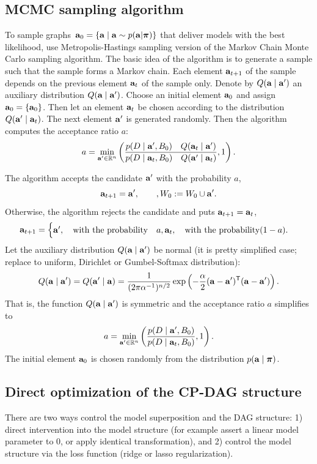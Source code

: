 \documentclass[12pt]{article}
\begin{document}
\subsection*{MCMC sampling algorithm}
To sample graphs~$\mathbf{a}_0 = \{\mathbf{a} \mid \mathbf{a} \sim p(\mathbf{a}|\boldsymbol{\pi})\}$ that deliver models with the best likelihood,
use Metropolis-Hastings sampling version of the Markov Chain Monte Carlo sampling algorithm.
The basic idea of the algorithm is to generate a sample such that the sample  forms a Markov chain.
Each element $\mathbf{a}_{t+1}$ of the sample depends on the previous element $\mathbf{a}_t$ of the sample  only.
Denote by $Q(\mathbf{a} \mid \mathbf{a}^\prime)$ an auxiliary distribution $Q(\mathbf{a}\mid \mathbf{a}^\prime)$.
Choose an initial element $\mathbf{a}_0$ and assign $\mathbf{a}_0 = \{\mathbf{a}_0\}$.
Then let an element $\mathbf{a}_t$ be chosen according  to the distribution $Q(\mathbf{a}^\prime\mid\mathbf{a}_t)$.
The next element $\mathbf{a}^\prime$ is generated randomly.
Then the algorithm computes the acceptance ratio $a$:
\[
    a = \min\limits_{\mathbf{a}^\prime\in\mathbb{R}^n}\left(
    \frac{p(D\mid\mathbf{a}^{\prime}, B_0)\quad Q(\mathbf{a}_t\mid\mathbf{a}^\prime)}
    {p(D\mid\mathbf{a}_t, B_0)\quad Q(\mathbf{a}^\prime\mid \mathbf{a}_t)}, 1\right).
\]

The algorithm accepts the candidate $\mathbf{a}^\prime$ with the probability $a$,
\[
    \mathbf{a}_{t+1} = \mathbf{a}^\prime, \qquad, W_0 := W_0 \cup \mathbf{a}^\prime.
\]
Otherwise, the algorithm rejects the candidate and puts $\mathbf{a}_{t+1} = \mathbf{a}_t$,
\[
\mathbf{a}_{t+1} =
\begin{cases}
\mathbf{a}^\prime, \quad\text{with the probability}\quad a,
\mathbf{a}_t, \quad\text{with the probability} (1-a).
\end{cases}
\]
Let the auxiliary distribution $Q(\mathbf{a} \mid \mathbf{a}^\prime)$ be normal (it is pretty simplified case; replace to uniform, Dirichlet or Gumbel-Softmax distribution):
\[
    Q(\mathbf{a} \mid \mathbf{a}^\prime) = Q(\mathbf{a}^\prime \mid \mathbf{a}) = \frac{1}{(2\pi\alpha^{-1})^{n/2}} \exp\left(-\frac{\alpha}{2}(\mathbf{a} - \mathbf{a}^\prime)^{\mathsf{T}} (\mathbf{a} - \mathbf{a}^\prime)\right).
\]
That is, the function $Q(\mathbf{a} \mid \mathbf{a}^\prime)$ is symmetric and
the acceptance ratio $a$ simplifies to
\[
    a = \min\limits_{\mathbf{a}^\prime\in\mathbb{R}^n}\left(
    \frac{p(D\mid\mathbf{a}^{\prime}, B_0)}{p(D\mid\mathbf{a}_t, B_0)}, 1\right).
\]
The initial element $\mathbf{a}_0$ is chosen randomly from the distribution $p(\mathbf{a} \mid \boldsymbol{\pi})$.

\subsection*{Direct optimization of the CP-DAG structure}
There are two ways control the model superposition and the DAG structure:
1) direct intervention into the model structure (for example assert a linear model parameter to 0, or apply identical transformation),
and 2) control the model structure via the loss function (ridge or lasso regularization).
\end{document}
